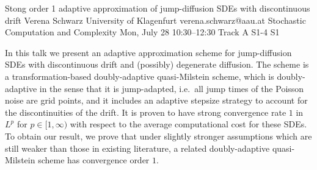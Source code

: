 \begin{talk}
  {Stong order 1 adaptive approximation of jump-diffusion SDEs with discontinuous drift}%
  {Verena Schwarz}%
  {University of Klagenfurt}%
  {verena.schwarz@aau.at}%
  {Stochastic Computation and Complexity}%
  {}%
  {Mon, July 28 10:30–12:30 Track A}%
  {S1-4}%
  {S1}%
				

In this talk we present an adaptive approximation scheme for jump-diffusion SDEs with discontinuous drift and (possibly) degenerate diffusion. The scheme is a transformation-based doubly-adaptive quasi-Milstein scheme, which 
is doubly-adaptive in the sense that it is jump-adapted, i.e.~all jump times of the Poisson noise are grid points, and it includes an adaptive stepsize strategy to account for the discontinuities of the drift. It is proven to have strong convergence rate $1$ in $L^p$ for $p\in[1,\infty)$ with respect to the average computational cost for these SDEs. 
To obtain our result, we prove that under slightly stronger assumptions which are still weaker than those in existing literature, a related doubly-adaptive quasi-Milstein scheme has convergence order $1$. 
\end{talk}

